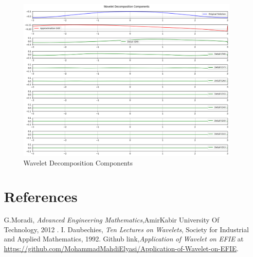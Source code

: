 \documentclass[12pt]{article}
\begin{document}
\begin{figure}[h!]
    \centering
    \includegraphics[width=\textwidth]{3.png}
    \caption{Wavelet Decomposition Components}
\end{figure}

\newpage

\clearpage

\section{References}

\begin{thebibliography}{99}
     G.Moradi, \textit{Advanced Engineering Mathematics},AmirKabir University Of Technology, 2012 .
     I. Daubechies, \textit{Ten Lectures on Wavelets}, Society for Industrial and Applied Mathematics, 1992.
     Github link,\textit{Application of Wavelet on EFIE} at \url{https://github.com/MohammadMahdiElyasi/Application-of-Wavelet-on-EFIE}.

\end{thebibliography}
\end{document}
